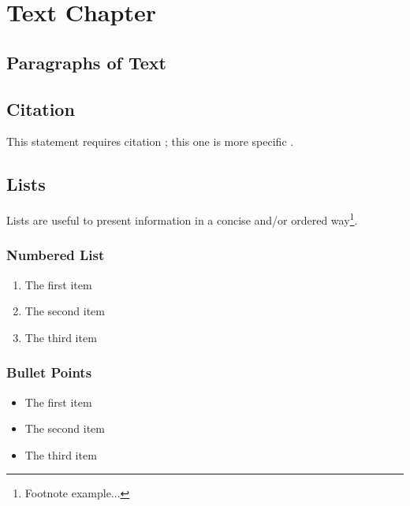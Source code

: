 
\chapter{Text Chapter}

\section{Paragraphs of Text}

\lipsum[1-7] %




\section{Citation}

This statement requires citation \cite{article_key}; this one is more specific \cite[162]{book_key}.


\section{Lists}

Lists are useful to present information in a concise and/or ordered way\footnote{Footnote example...}.

\subsection{Numbered List}

\begin{enumerate}
\item The first item
\item The second item
\item The third item
\end{enumerate}

\subsection{Bullet Points}

\begin{itemize}
\item The first item
\item The second item
\item The third item
\end{itemize}

